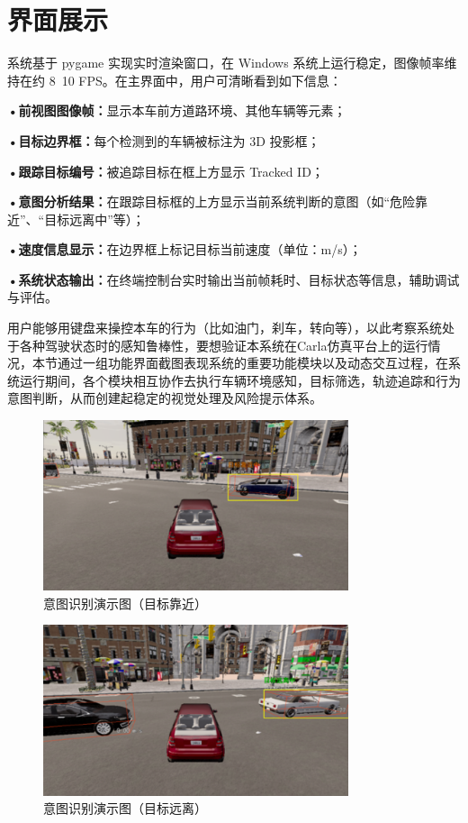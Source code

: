 \section{界面展示}

系统基于 pygame 实现实时渲染窗口，在 Windows 系统上运行稳定，图像帧率维持在约 8~10 FPS。在主界面中，用户可清晰看到如下信息：

\textbf{•前视图图像帧：}显示本车前方道路环境、其他车辆等元素；

\textbf{•目标边界框：}每个检测到的车辆被标注为 3D 投影框；

\textbf{•跟踪目标编号：}被追踪目标在框上方显示 Tracked ID；

\textbf{•意图分析结果：}在跟踪目标框的上方显示当前系统判断的意图（如“危险靠近”、“目标远离中”等）；

\textbf{•速度信息显示：}在边界框上标记目标当前速度（单位：m/s）；

\textbf{•系统状态输出：}在终端控制台实时输出当前帧耗时、目标状态等信息，辅助调试与评估。

用户能够用键盘来操控本车的行为（比如油门，刹车，转向等），以此考察系统处于各种驾驶状态时的感知鲁棒性，要想验证本系统在Carla仿真平台上的运行情况，本节通过一组功能界面截图表现系统的重要功能模块以及动态交互过程，在系统运行期间，各个模块相互协作去执行车辆环境感知，目标筛选，轨迹追踪和行为意图判断，从而创建起稳定的视觉处理及风险提示体系。

\begin{figure}[H]
    \centering
    \includegraphics[width=0.8\textwidth]{images/图13 意图识别演示图（目标靠近）.pdf}  %
    \caption{意图识别演示图（目标靠近）}
    \label{fig:example_image}  %
\end{figure}

\begin{figure}[H]
    \centering
    \includegraphics[width=0.8\textwidth]{images/图14 意图识别演示图（目标远离）.pdf}  %
    \caption{意图识别演示图（目标远离）}
    \label{fig:example_image}  %
\end{figure}

